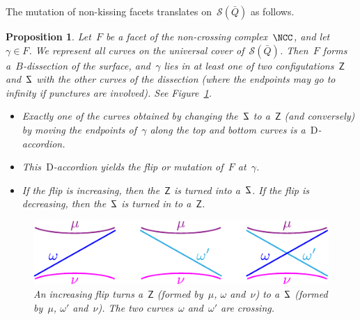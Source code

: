 \documentclass{amsart}
\newtheorem{proposition}[theorem]{Proposition}
\theoremstyle{definition}
\newcommand{\fref}[1]{Figure~\ref{#1}} %
\newcommand{\surface}{\mathcal{S}} %
\newcommand{\dissection}{\mathrm{D}} %
\DeclareRobustCommand{\SSS}{\reflectbox{$\mathsf{Z}$}} %
\DeclareRobustCommand{\ZZZ}{\mathsf{Z}} %
\begin{document}
The mutation of non-kissing facets translates on~$\surface(\bar Q)$ as follows.

\begin{proposition}
\label{prop:mutationAccordions}
Let~$F$ be a facet of the non-crossing complex~$\NCC$, and let~$\gamma \in F$.  We represent all curves on the universal cover of~$\surface(\bar Q)$.
Then~$F$ forms a~$B$-dissection of the surface, and~$\gamma$ lies in at least one of two configutations~$\ZZZ$ and~$\SSS$ with the other curves of the dissection (where the endpoints may go to infinity if punctures are involved).  See \fref{fig:flip3}.
\begin{itemize}
\item Exactly one of the curves obtained by changing the~$\SSS$ to a~$\ZZZ$ (and conversely) by moving the endpoints of~$\gamma$ along the top and bottom curves is a~$\dissection$-accordion.
\item This~$\dissection$-accordion yields the flip or mutation of~$F$ at~$\gamma$.
\item If the flip is increasing, then the~$\ZZZ$ is turned into a~$\SSS$.  If the flip is decreasing, then the~$\SSS$ is turned in to a~$\ZZZ$.
\end{itemize}
%
\begin{figure}[h]
	\capstart
	\centerline{\includegraphics[scale=1]{flip3}}
	\caption{An increasing flip turns a~$\ZZZ$ (formed by~$\mu$, $\omega$ and~$\nu$) to a~$\SSS$ (formed by~$\mu$, $\omega'$ and~$\nu$). The two curves~$\omega$ and~$\omega'$ are crossing.}
	\label{fig:flip3}
\end{figure}
\end{proposition}
\end{document}
